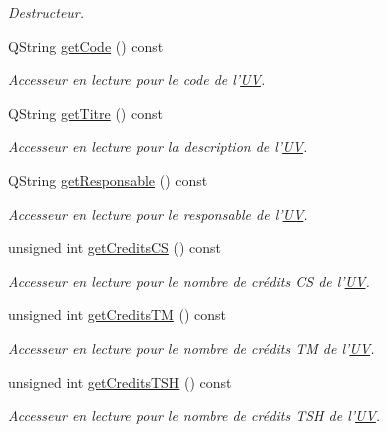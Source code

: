 \begin{DoxyCompactItemize}
\begin{DoxyCompactList}\small\item\em Destructeur. \end{DoxyCompactList}\item 
Q\-String \hyperlink{class_u_v_a4d5fe39505b3e474b41013dda0d2047a}{get\-Code} () const 
\begin{DoxyCompactList}\small\item\em Accesseur en lecture pour le code de l'\hyperlink{class_u_v}{U\-V}. \end{DoxyCompactList}\item 
Q\-String \hyperlink{class_u_v_afa7f5a8c7ea21bedcd00af1a1ff48221}{get\-Titre} () const 
\begin{DoxyCompactList}\small\item\em Accesseur en lecture pour la description de l'\hyperlink{class_u_v}{U\-V}. \end{DoxyCompactList}\item 
Q\-String \hyperlink{class_u_v_a845116e7deb10361c2723c9e90042a62}{get\-Responsable} () const 
\begin{DoxyCompactList}\small\item\em Accesseur en lecture pour le responsable de l'\hyperlink{class_u_v}{U\-V}. \end{DoxyCompactList}\item 
unsigned int \hyperlink{class_u_v_a348f309560bf41191f58fe47b6db9254}{get\-Credits\-C\-S} () const 
\begin{DoxyCompactList}\small\item\em Accesseur en lecture pour le nombre de crédits C\-S de l'\hyperlink{class_u_v}{U\-V}. \end{DoxyCompactList}\item 
unsigned int \hyperlink{class_u_v_af0ec1e2a228d470e0e9eac9bc7f7fc21}{get\-Credits\-T\-M} () const 
\begin{DoxyCompactList}\small\item\em Accesseur en lecture pour le nombre de crédits T\-M de l'\hyperlink{class_u_v}{U\-V}. \end{DoxyCompactList}\item 
unsigned int \hyperlink{class_u_v_aba3762bf14e1749bd721e736e366810a}{get\-Credits\-T\-S\-H} () const 
\begin{DoxyCompactList}\small\item\em Accesseur en lecture pour le nombre de crédits T\-S\-H de l'\hyperlink{class_u_v}{U\-V}. \end{DoxyCompactList}\item 

\end{DoxyCompactItemize}
